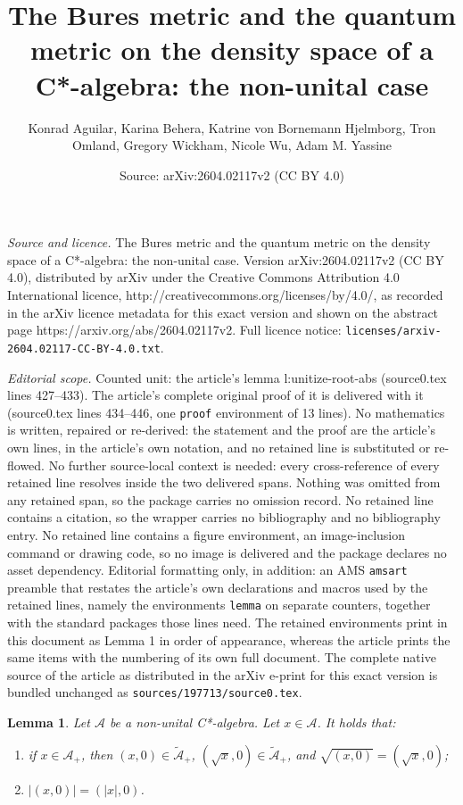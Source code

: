 \documentclass[10pt,a4paper]{amsart}
\title{The Bures metric and the quantum metric on the density space of a C*-algebra: the non-unital case}
\author{Konrad Aguilar, Karina Behera, Katrine von Bornemann Hjelmborg, Tron Omland, Gregory Wickham, Nicole Wu, Adam M. Yassine}
\date{Source: arXiv:2604.02117v2 (CC BY 4.0)}
\newtheorem{lemma}{Lemma}
\newcommand{\A}{{\mathcal{A}}}
\newcommand{\wt}[1]{{\widetilde{#1}}}
\begin{document}
\maketitle

\noindent\emph{Source and licence.} The Bures metric and the quantum metric on the density space of a C*-algebra: the non-unital case. Version arXiv:2604.02117v2 (CC BY 4.0), distributed by arXiv under the Creative Commons Attribution 4.0 International licence, http://creativecommons.org/licenses/by/4.0/, as recorded in the arXiv licence metadata for this exact version and shown on the abstract page https://arxiv.org/abs/2604.02117v2. Full licence notice: \texttt{licenses/arxiv-2604.02117-CC-BY-4.0.txt}.\par\smallskip

\noindent\textit{Editorial scope.} Counted unit: the article's lemma l:unitize-root-abs (source0.tex lines 427--433). The article's complete original proof of it is delivered with it (source0.tex lines 434--446, one \texttt{proof} environment of 13 lines). No mathematics is written, repaired or re-derived: the statement and the proof are the article's own lines, in the article's own notation, and no retained line is substituted or re-flowed.  No further source-local context is needed: every cross-reference of every retained line resolves inside the two delivered spans.  Nothing was omitted from any retained span, so the package carries no omission record.  No retained line contains a citation, so the wrapper carries no bibliography and no bibliography entry.  No retained line contains a figure environment, an image-inclusion command or drawing code, so no image is delivered and the package declares no asset dependency.  Editorial formatting only, in addition: an AMS \texttt{amsart} preamble that restates the article's own declarations and macros used by the retained lines, namely the environments \texttt{lemma} on separate counters, together with the standard packages those lines need.  The retained environments print in this document as Lemma 1 in order of appearance, whereas the article prints the same items with the numbering of its own full document.  The complete native source of the article as distributed in the arXiv e-print for this exact version is bundled unchanged as \texttt{sources/197713/source0.tex}.
\begin{lemma}\label{l:unitize-root-abs}
    Let $\A$ be a non-unital C*-algebra. Let $x\in \A$. It holds that:
    \begin{enumerate}
        \item if $x\in \A_+$, then $(x, 0)\in \wt{\A}_+ $, $(\sqrt{x}, 0)\in \wt{\A}_+$, and $\sqrt{(x,0)}=\left( \sqrt{x}, 0\right)$;
        \item $|(x,0)|=(|x|,0)$.
    \end{enumerate}
\end{lemma}
\end{document}
